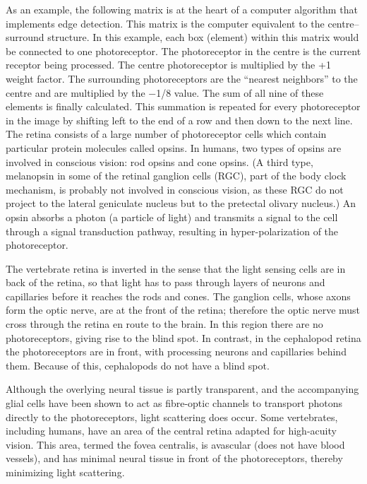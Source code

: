 As an example, the following matrix is at the heart of a computer algorithm that implements edge detection. This matrix is the computer equivalent to the centre--surround structure. In this example, each box (element) within this matrix would be connected to one photoreceptor. The photoreceptor in the centre is the current receptor being processed. The centre photoreceptor is multiplied by the +1 weight factor. The surrounding photoreceptors are the ``nearest neighbors'' to the centre and are multiplied by the −1/8 value. The sum of all nine of these elements is finally calculated. This summation is repeated for every photoreceptor in the image by shifting left to the end of a row and then down to the next line.
The retina consists of a large number of photoreceptor cells which contain particular protein molecules called opsins. In humans, two types of opsins are involved in conscious vision: rod opsins and cone opsins. (A third type, melanopsin in some of the retinal ganglion cells (RGC), part of the body clock mechanism, is probably not involved in conscious vision, as these RGC do not project to the lateral geniculate nucleus but to the pretectal olivary nucleus.) An opsin absorbs a photon (a particle of light) and transmits a signal to the cell through a signal transduction pathway, resulting in hyper-polarization of the photoreceptor.

The vertebrate retina is inverted in the sense that the light sensing cells are in back of the retina, so that light has to pass through layers of neurons and capillaries before it reaches the rods and cones. The ganglion cells, whose axons form the optic nerve, are at the front of the retina; therefore the optic nerve must cross through the retina en route to the brain. In this region there are no photoreceptors, giving rise to the blind spot. In contrast, in the cephalopod retina the photoreceptors are in front, with processing neurons and capillaries behind them. Because of this, cephalopods do not have a blind spot.

Although the overlying neural tissue is partly transparent, and the accompanying glial cells have been shown to act as fibre-optic channels to transport photons directly to the photoreceptors, light scattering does occur. Some vertebrates, including humans, have an area of the central retina adapted for high-acuity vision. This area, termed the fovea centralis, is avascular (does not have blood vessels), and has minimal neural tissue in front of the photoreceptors, thereby minimizing light scattering.

